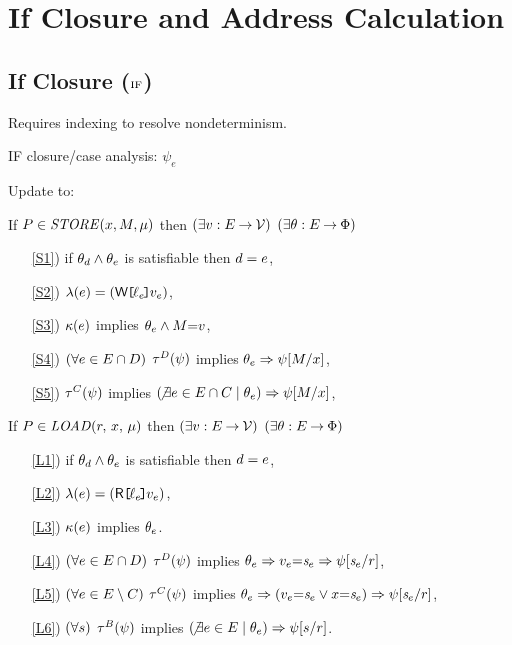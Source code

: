 \section{If Closure and Address Calculation}
\label{sec:complications}

\subsection{If Closure ($\xIF$)}
Requires indexing to resolve nondeterminism.

IF closure/case analysis: $\psi_e$

\begin{definition}[$\xIF$]
  \label{def:pomsets-if}
  Update  to:

  If $\aPS \in \sSTOREtight[\amode]{\aLoc}{\aExp}$ then
  $(\exists v:E\mathbin\rightarrow\mathcal{V})$
  $(\exists\theta:E\mathbin\rightarrow\Phi)$
  \begin{enumerate}
  \item[\ref{S1})] if $\theta_d\land\theta_e$ is satisfiable then $d=e$,
  \item[\ref{S2})] $\labelingAct(\aEv) = \DWREFP{\cVal_\aEv}{\aVal_\aEv}$,
  \item[\ref{S3})] $\kappa(e)$ implies $\theta_e \land M{=}v$,
  \item[\ref{S4})] $(\forall e\in E\cap D)$
    $\aTr{\bEvs}{\bForm}$ implies $\theta_e \Rightarrow \psi[M/x]$,
  \item[\ref{S5})] 
    $\aTr{\cEvs}{\bForm}$ implies $(\!\not\exists e\in E\cap C \mid \theta_e) \Rightarrow \psi[M/x]$,
  \end{enumerate}

  If $\aPS \in \sLOAD[\amode]{\aReg}{\aLoc}$ then
  $(\exists v:E\mathbin\rightarrow\mathcal{V})$
  $(\exists\theta:E\mathbin\rightarrow\Phi)$
  \begin{enumerate}
  \item[\ref{L1})] if $\theta_d\land\theta_e$ is satisfiable then $d=e$,
  \item[\ref{L2})] $\labelingAct(\aEv) = \DRREFP{\cVal_\aEv}{\aVal_\aEv}$,
  \item[\ref{L3})] $\kappa(e)$ implies $\theta_e$.
  \item[\ref{L4})] $(\forall e\in E\cap D)$
    $\aTr{\bEvs}{\bForm}$ implies $\theta_e \Rightarrow v_e{=}\mathit{s}_{e}\Rightarrow\psi[\mathit{s}_{e}/r]$, 
  \item[\ref{L5})] $(\forall e\in E\setminus C)$
    $\aTr{\cEvs}{\bForm}$ implies $\theta_e \Rightarrow (v_e{=}\mathit{s}_{e}\lor x{=}\mathit{s}_{e})\allowbreak\Rightarrow\psi[\mathit{s}_{e}/r]$,
  \item[\ref{L6})] $(\forall s)$
    $\aTr{\dEvs}{\bForm}$ implies $(\!\not\exists e\in E \mid \theta_e) \Rightarrow \psi[s/r]$. 
  \end{enumerate}  
\end{definition}

